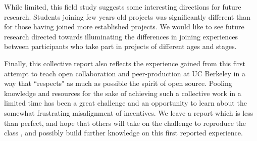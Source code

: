 While limited, this field study suggests some interesting directions for future research. Students joining few years old projects was significantly different than for those having joined more established projects.  We would like to see future research directed towards illuminating the differences in joining experiences between participants who take part in projects of different ages and stages. 

Finally, this collective report also reflects the experience gained from this first attempt to teach open collaboration and peer-production at UC Berkeley in a way that ``respects" as much as possible the spirit of open source. Pooling knowledge and resources for the sake of achieving such a collective work in a limited time has been a great challenge and an opportunity to learn about the somewhat frustrating misalignment of incentives. We leave a report which is less than perfect, and hope that others will take on the challenge to reproduce the class \cite{classweb2013}, and possibly build further knowledge on this first reported experience.

